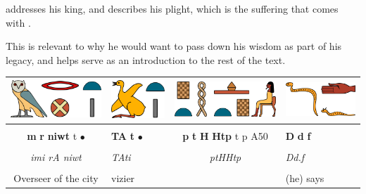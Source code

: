  addresses his king,  and describes his plight, which is the suffering that comes with .

This is relevant to why he would want to pass down his wisdom as part of his legacy, and helps serve as an introduction to the rest of the text.

\pagebreak

\begin{center}

\begin{tabularx}{\linewidth}{cYcY}
	\includegraphics[scale=0.5]{word-images/1-1-1-imy-ra-niwt} &
	\includegraphics[scale=0.5]{word-images/1-1-2-tAti} &
	\includegraphics[scale=0.5]{word-images/1-1-3-ptH-Htp} &
	\includegraphics[scale=0.5]{word-images/1-1-4-Ddf} \\
	\hline \\ 
	\textbf{m} \textbf{r} \textbf{niwt} t $\bullet$ &
	\textbf{TA} \textbf{t} $\bullet$ &
	\textbf{p} \textbf{t} \textbf{H} \textbf{Htp} t p A50 &
	\textbf{D} \textbf{d} \textbf{f}\\
	\hline \\
	\textit{imi rA niwt} & \textit{TAti} & \textit{ptHHtp} & \textit{Dd.f} \\  
	\hline \\
	Overseer of the city & vizier &  & (he) says    
\end{tabularx}


\end{center}
